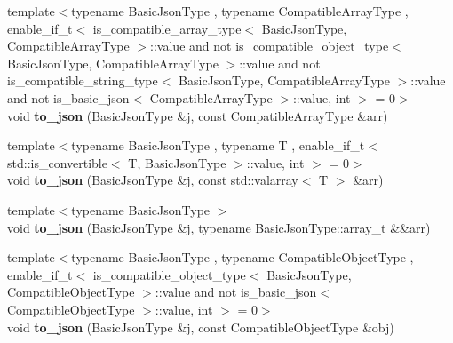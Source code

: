 \begin{DoxyCompactItemize}
\item 
\mbox{\label{namespacenlohmann_1_1detail_a3afebc132c5ff83f9cd160e52030fdfd}} 
{\footnotesize template$<$typename Basic\+Json\+Type , typename Compatible\+Array\+Type , enable\+\_\+if\+\_\+t$<$ is\+\_\+compatible\+\_\+array\+\_\+type$<$ Basic\+Json\+Type, Compatible\+Array\+Type $>$\+::value and not is\+\_\+compatible\+\_\+object\+\_\+type$<$ Basic\+Json\+Type, Compatible\+Array\+Type $>$\+::value and not is\+\_\+compatible\+\_\+string\+\_\+type$<$ Basic\+Json\+Type, Compatible\+Array\+Type $>$\+::value and not is\+\_\+basic\+\_\+json$<$ Compatible\+Array\+Type $>$\+::value, int $>$  = 0$>$ }\\void {\bfseries to\+\_\+json} (Basic\+Json\+Type \&j, const Compatible\+Array\+Type \&arr)
\item 
\mbox{\label{namespacenlohmann_1_1detail_a7f7c7b9760161b774cdc0b4b838fae64}} 
{\footnotesize template$<$typename Basic\+Json\+Type , typename T , enable\+\_\+if\+\_\+t$<$ std\+::is\+\_\+convertible$<$ T, Basic\+Json\+Type $>$\+::value, int $>$  = 0$>$ }\\void {\bfseries to\+\_\+json} (Basic\+Json\+Type \&j, const std\+::valarray$<$ T $>$ \&arr)
\item 
\mbox{\label{namespacenlohmann_1_1detail_aa0fd1b5788e9ba37e31da43dda738cb5}} 
{\footnotesize template$<$typename Basic\+Json\+Type $>$ }\\void {\bfseries to\+\_\+json} (Basic\+Json\+Type \&j, typename Basic\+Json\+Type\+::array\+\_\+t \&\&arr)
\item 
\mbox{\label{namespacenlohmann_1_1detail_a24c9c12f3839c94e09532f08de85e949}} 
{\footnotesize template$<$typename Basic\+Json\+Type , typename Compatible\+Object\+Type , enable\+\_\+if\+\_\+t$<$ is\+\_\+compatible\+\_\+object\+\_\+type$<$ Basic\+Json\+Type, Compatible\+Object\+Type $>$\+::value and not is\+\_\+basic\+\_\+json$<$ Compatible\+Object\+Type $>$\+::value, int $>$  = 0$>$ }\\void {\bfseries to\+\_\+json} (Basic\+Json\+Type \&j, const Compatible\+Object\+Type \&obj)
\item 
\mbox{\label{namespacenlohmann_1_1detail_ac9f7a5542851c61d93740148eaec509f}} 

\end{DoxyCompactItemize}
